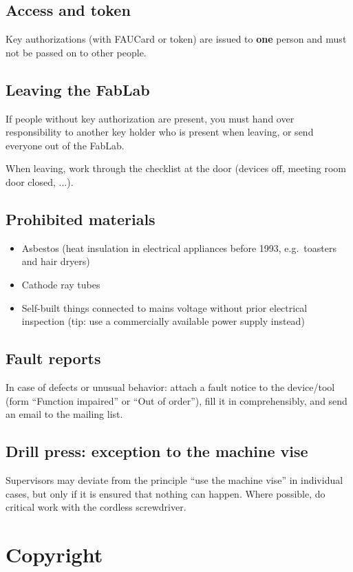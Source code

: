 \documentclass[13pt]{\basedir/fablab-document}
\begin{document}
\subsection{Access and token}
Key authorizations (with FAUCard or token) are issued to \textbf{one} person and must not be passed on to other people.

\subsection{Leaving the FabLab}
If people without key authorization are present, you must hand over responsibility to another key holder who is present when leaving, or send everyone out of the FabLab.

When leaving, work through the checklist at the door (devices off, meeting room door closed, ...).

\subsection{Prohibited materials}
\begin{itemize}
	\item Asbestos (heat insulation in electrical appliances before 1993, e.g.\ toasters and hair dryers)
	\item Cathode ray tubes
	\item Self-built things connected to mains voltage without prior electrical inspection (tip: use a commercially available power supply instead)
\end{itemize}

\subsection{Fault reports}
In case of defects or unusual behavior: attach a fault notice to the device/tool (form \enquote{Function impaired} or \enquote{Out of order}), fill it in comprehensibly, and send an email to the mailing list.

\subsection{Drill press: exception to the machine vise}
Supervisors may deviate from the principle \enquote{use the machine vise} in individual cases, but only if it is ensured that nothing can happen. Where possible, do critical work with the cordless screwdriver.

\section{Copyright}
\end{document}

